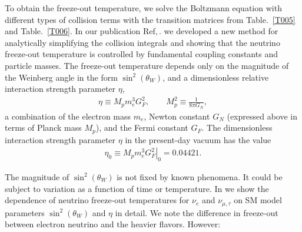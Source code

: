 \begin{enumerate}
\end{enumerate}

To obtain the freeze-out temperature, we  solve the Boltzmann equation with different types of collision terms with the transition matrices from Table.~\ref{T005} and Table.~\ref{T006}. In our publication Ref,\,.\cite{Birrell:2014uka} we developed a new method for analytically simplifying the collision integrals and showing that the neutrino freeze-out temperature is controlled by fundamental coupling constants and particle masses. The freeze-out temperature depends only on the magnitude of the Weinberg angle in the form $\sin^2(\theta_W)$, and a dimensionless relative interaction strength parameter $\eta$,
\begin{align}
\eta\equiv M_p m_e^3 G_F^2, \qquad M_p^2\equiv \frac{1}{8\pi G_N}, \end{align}
a combination of the electron mass $m_e$, Newton constant $G_N$ (expressed above in terms of Planck mass $M_p$), and the Fermi constant $G_F$. The dimensionless interaction strength parameter $\eta$ in the present-day vacuum has the value
\begin{align}
\eta_0\equiv \left.M_p m_e^3 G_F^2\right|_0 = 0.04421 .
\end{align}

The magnitude of $\sin^2(\theta_W)$ is not fixed by known phenomena. It could be subject to variation as a function of time or temperature. In  we show the dependence of neutrino freeze-out temperatures for $\nu_e$ and $\nu_{\mu,\tau}$ on SM model parameters $\sin^2(\theta_W)$ and $\eta$ in detail. We note the difference in freeze-out between electron neutrino and the heavier flavors. However:

